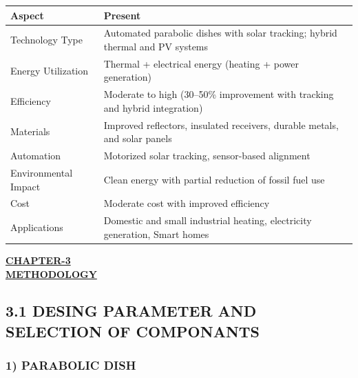 \documentclass[12pt,a4paper]{article}
\begin{document}
\begin{center}
\renewcommand{\arraystretch}{1.3}
\begin{tabular}{|p{38mm}|p{85mm}|}
\hline
\rowcolor{gray!20}
\textbf{Aspect} & \textbf{Present} \\
\hline
Technology Type & Automated parabolic dishes with solar tracking; hybrid thermal and PV systems \\
\hline
Energy Utilization & Thermal + electrical energy (heating + power generation) \\
\hline
Efficiency & Moderate to high (30--50\% improvement with tracking and hybrid integration) \\
\hline
Materials & Improved reflectors, insulated receivers, durable metals, and solar panels \\
\hline
Automation & Motorized solar tracking, sensor-based alignment \\
\hline
Environmental Impact & Clean energy with partial reduction of fossil fuel use \\
\hline
Cost & Moderate cost with improved efficiency \\
\hline
Applications & Domestic and small industrial heating, electricity generation, Smart homes \\
\hline
\end{tabular}
\end{center}
\clearpage




\begin{center}
  {\fontsize{15}{18}\selectfont \bfseries \textcolor{red!80!black}{\underline{CHAPTER-3}}}\\[2mm]
  {\fontsize{16}{20}\selectfont \bfseries \textcolor{red!80!black}{\underline{METHODOLOGY}}}\\[4mm]
\end{center}

\subsection*{3.1 DESING PARAMETER AND SELECTION OF COMPONANTS}
\subsubsection*{1) PARABOLIC DISH}
\end{document}
